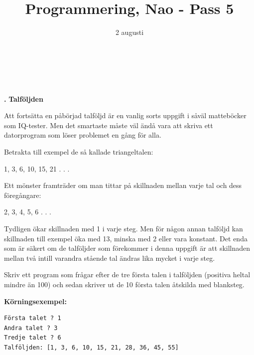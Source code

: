 \documentclass[a4paper,12pt]{article}
\title{Programmering, Nao - Pass 5}
\date{2 augusti}
\makeatletter
\newcounter{iii}\setcounter{iii}{0}
\def\i{\bigskip\noindent\refstepcounter{iii}\textbf{\arabic{iii}.} }
\let\newtitle\@title
\let\newdate\@date
\makeatother
\begin{document}
  \renewcommand*\rmdefault{ppl}\normalfont\upshape
\pagestyle{empty}
\large
\section*{\newdate\ \  \newtitle}

\i \textbf{Talföljden}

Att fortsätta en påbörjad talföljd är en vanlig sorts uppgift i såväl matteböcker som IQ-tester. Men det smartaste måste väl ändå vara att skriva ett datorprogram som löser problemet en gång för alla.

Betrakta till exempel de så kallade triangeltalen:

1, 3, 6, 10, 15, 21 . . .

Ett mönster framträder om man tittar på skillnaden mellan varje tal och dess föregångare:

2, 3, 4, 5, 6 . . .

Tydligen ökar skillnaden med 1 i varje steg. Men för någon annan talföljd kan skillnaden till exempel öka med 13, minska med 2 eller vara konstant. Det enda som är säkert om de talföljder som förekommer i denna uppgift är att skillnaden mellan två intill varandra stående tal ändras lika mycket i varje steg.

Skriv ett program som frågar efter de tre första talen i talföljden (positiva heltal mindre än 100) och sedan skriver ut de 10 första talen åtskilda med blanksteg.

\textbf{Körningsexempel:}
\begin{lstlisting}
Första talet ? 1
Andra talet ? 3
Tredje talet ? 6
Talföljden: [1, 3, 6, 10, 15, 21, 28, 36, 45, 55]
\end{lstlisting}

\end{document}
